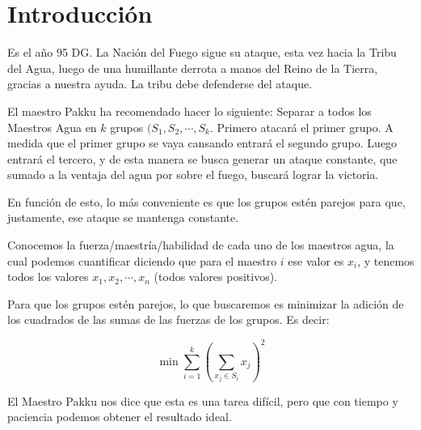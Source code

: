 \section{Introducción}

Es el año 95 DG. La Nación del Fuego sigue su ataque, esta vez hacia la Tribu del Agua,
luego de una humillante derrota a manos del Reino de la Tierra, gracias a nuestra ayuda.
La tribu debe defenderse del ataque.

El maestro Pakku ha recomendado hacer lo siguiente: Separar a todos los Maestros Agua en 
$k$ grupos $(S_{1},S_{2},\cdots,S_{k}$. Primero atacará el primer grupo. A medida que el primer
grupo se vaya cansando entrará el segundo grupo. Luego entrará el tercero, y de esta manera
se busca generar un ataque constante, que sumado a la ventaja del agua por sobre el fuego,
buscará lograr la victoria.

En función de esto, lo más conveniente es que los grupos estén parejos para que, justamente,
ese ataque se mantenga constante.

Conocemos la fuerza/maestría/habilidad de cada uno de los maestros agua, la cual podemos
cuantificar diciendo que para el maestro $i$ ese valor es $x_{i}$, y tenemos todos los
valores $x_{1},x_{2},\cdots,x_{n}$ (todos valores positivos).

Para que los grupos estén parejos, lo que buscaremos es minimizar la adición de los cuadrados
de las sumas de las fuerzas de los grupos. Es decir:

\[
\min\sum_{i=1}^{k}\left( \sum_{x_{j}\in S_{i}}^{}x_{j} \right)^{2}
\]
 
El Maestro Pakku nos dice que esta es una tarea difícil, pero que con tiempo y paciencia podemos
obtener el resultado ideal.